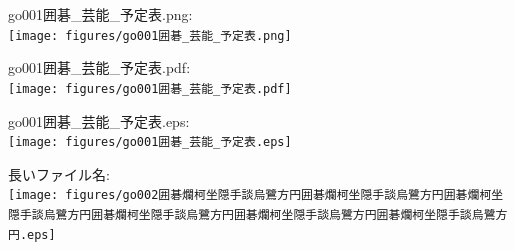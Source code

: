 \documentclass[autodetect-engine,twocolumn]{jsarticle}
\begin{document}
go001囲碁\_芸能\_予定表.png:\\ %
\texttt{[image: figures/go001囲碁\_芸能\_予定表.png]}

go001囲碁\_芸能\_予定表.pdf:\\ %
\texttt{[image: figures/go001囲碁\_芸能\_予定表.pdf]}

go001囲碁\_芸能\_予定表.eps:\\ %
\texttt{[image: figures/go001囲碁\_芸能\_予定表.eps]}

長いファイル名:\\
\texttt{[image: figures/go002囲碁爛柯坐隠手談烏鷺方円囲碁爛柯坐隠手談烏鷺方円囲碁爛柯坐隠手談烏鷺方円囲碁爛柯坐隠手談烏鷺方円囲碁爛柯坐隠手談烏鷺方円囲碁爛柯坐隠手談烏鷺方円.eps]}
\end{document}
